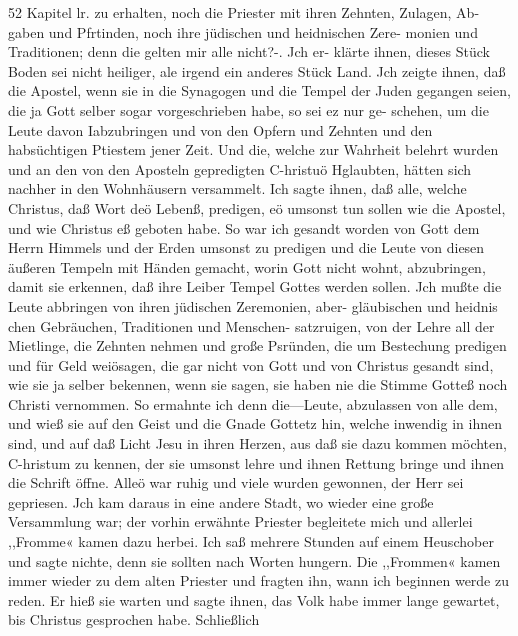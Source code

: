 52 Kapitel lr.
zu erhalten, noch die Priester mit ihren Zehnten, Zulagen, Ab-
gaben und Pfrtinden, noch ihre jüdischen und heidnischen Zere-
monien und Traditionen; denn die gelten mir alle nicht?-. Jch er-
klärte ihnen, dieses Stück Boden sei nicht heiliger, ale irgend ein
anderes Stück Land. Jch zeigte ihnen, daß die Apostel, wenn
sie in die Synagogen und die Tempel der Juden gegangen seien,
die ja Gott selber sogar vorgeschrieben habe, so sei ez nur ge-
schehen, um die Leute davon Iabzubringen und von den Opfern
und Zehnten und den habsüchtigen Ptiestem jener Zeit. Und
die, welche zur Wahrheit belehrt wurden und an den von den
Aposteln gepredigten C-hristuö Hglaubten, hätten sich nachher in
den Wohnhäusern versammelt. Ich sagte ihnen, daß alle, welche
Christus, daß Wort deö Lebenß, predigen, eö umsonst tun sollen
wie die Apostel, und wie Christus eß geboten habe. So war ich
gesandt worden von Gott dem Herrn Himmels und der Erden
umsonst zu predigen und die Leute von diesen äußeren Tempeln
mit Händen gemacht, worin Gott nicht wohnt, abzubringen, damit
sie erkennen, daß ihre Leiber Tempel Gottes werden sollen. Jch
mußte die Leute abbringen von ihren jüdischen Zeremonien, aber-
gläubischen und heidnis chen Gebräuchen, Traditionen und Menschen-
satzruigen, von der Lehre all der Mietlinge, die Zehnten nehmen
und große Psründen, die um Bestechung predigen und für Geld
weiösagen, die gar nicht von Gott und von Christus gesandt
sind, wie sie ja selber bekennen, wenn sie sagen, sie haben nie
die Stimme Gotteß noch Christi vernommen. So ermahnte ich
denn die—Leute, abzulassen von alle dem, und wieß sie auf den
Geist und die Gnade Gottetz hin, welche inwendig in ihnen sind,
und auf daß Licht Jesu in ihren Herzen, aus daß sie dazu kommen
möchten, C-hristum zu kennen, der sie umsonst lehre und ihnen
Rettung bringe und ihnen die Schrift öffne. Alleö war ruhig
und viele wurden gewonnen, der Herr sei gepriesen.
Jch kam daraus in eine andere Stadt, wo wieder eine große
Versammlung war; der vorhin erwähnte Priester begleitete mich
und allerlei ,,Fromme« kamen dazu herbei. Ich saß mehrere
Stunden auf einem Heuschober und sagte nichte, denn sie sollten
nach Worten hungern. Die ,,Frommen« kamen immer wieder
zu dem alten Priester und fragten ihn, wann ich beginnen werde
zu reden. Er hieß sie warten und sagte ihnen, das Volk habe
immer lange gewartet, bis Christus gesprochen habe. Schließlich



